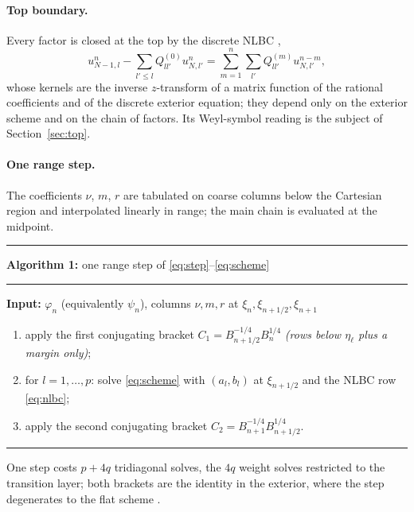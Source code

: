 \documentclass[11pt]{article}
\newcommand{\het}{\nu}
\newcommand{\etal}{\eta_{\ell}}
\begin{document}
\paragraph{Top boundary.} Every factor is closed at the top by the discrete
NLBC \cite{lytaev2018awpl},
\begin{equation}\label{eq:nlbc}
u^n_{N-1,l}-\sum_{l'\le l}Q^{(0)}_{ll'}u^n_{N,l'}
=\sum_{m=1}^{n}\sum_{l'}Q^{(m)}_{ll'}u^{n-m}_{N,l'} ,
\end{equation}
whose kernels are the inverse $z$-transform of a matrix function of the
rational coefficients and of the discrete exterior equation; they depend only
on the exterior scheme and on the chain of factors. Its Weyl-symbol reading
is the subject of Section~\ref{sec:top}.

\paragraph{One range step.} The coefficients $\het$, $m$, $r$ are tabulated on
coarse columns below the Cartesian region and interpolated linearly in range;
the main chain is evaluated at the midpoint.
\begin{center}
\begin{minipage}{0.92\linewidth}
\hrule\vspace{2pt}
\textbf{Algorithm 1:} one range step of \eqref{eq:step}--\eqref{eq:scheme}
\vspace{1pt}\hrule\vspace{2pt}
\textbf{Input:} $\varphi_n$ (equivalently $\psi_n$), columns $\het,m,r$ at
$\xi_n,\xi_{n+1/2},\xi_{n+1}$
\begin{enumerate}
\item apply the first conjugating bracket $C_1=B_{n+1/2}^{-1/4}B_n^{1/4}$
  \emph{(rows below $\etal$ plus a margin only)};
\item for $l=1,\dots,p$: solve \eqref{eq:scheme} with $(a_l,b_l)$ at
  $\xi_{n+1/2}$ and the NLBC row \eqref{eq:nlbc};
\item apply the second conjugating bracket $C_2=B_{n+1}^{-1/4}B_{n+1/2}^{1/4}$.
\end{enumerate}
\vspace{-4pt}\hrule
\end{minipage}
\end{center}
One step costs $p+4q$ tridiagonal solves, the $4q$ weight solves restricted
to the transition layer; both brackets are the identity in the exterior,
where the step degenerates to the flat scheme \cite{lytaev2020awpl}.
\end{document}
